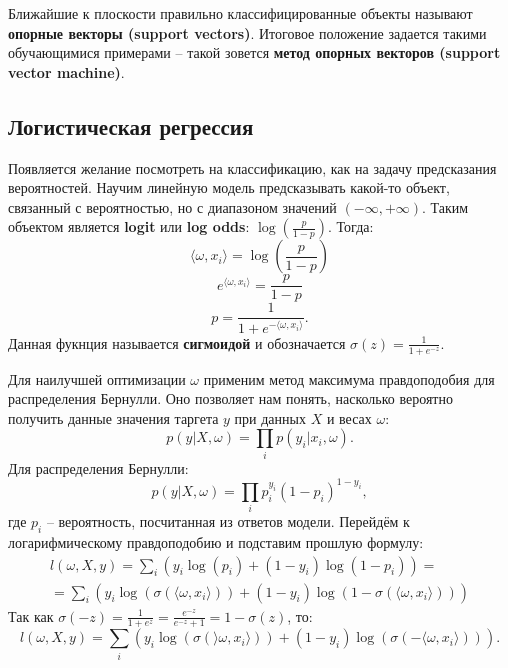 \documentclass[a4paper, 10pt, openany]{book} %
\begin{document}
	Ближайшие к плоскости правильно классифицированные объекты называют \textbf{опорные векторы (support vectors)}. Итоговое положение задается такими обучающимися примерами -- такой зовется \textbf{метод опорных векторов (support vector machine)}.
	
	\subsection{Логистическая регрессия}
	
	Появляется желание посмотреть на классификацию, как на задачу предсказания вероятностей. Научим линейную модель предсказывать какой-то объект, связанный с вероятностью, но с диапазоном значений $(-\infty, +\infty)$. Таким объектом является \textbf{logit} или \textbf{log odds}: $\log\left(\frac{p}{1-p}\right)$. Тогда:
	\begin{equation*}
		\langle\omega,x_i\rangle = \log\left(\frac{p}{1 - p}\right)
	\end{equation*}
	\begin{equation*}
		e^{\langle\omega,x_i\rangle}  = \frac{p}{1 - p}
	\end{equation*}
	\begin{equation*}
		p = \frac{1}{1 + e^{-\langle\omega,x_i\rangle}}.
	\end{equation*}
	Данная фукнция называется \textbf{сигмоидой} и обозначается $\sigma(z) = \frac{1}{1 + e^{-z}}$.
	
	Для наилучшей оптимизации $\omega$ применим метод максимума правдоподобия для распределения Бернулли. Оно позволяет нам понять, насколько вероятно получить данные значения таргета $y$ при данных $X$ и весах $\omega$:
	\begin{equation*}
		p\left(y | X,\omega\right) = \prod_i p(y_i | x_i, \omega).
	\end{equation*}
	Для распределения Бернулли:
	\begin{equation*}
		p\left(y | X,\omega\right) = \prod_i p_i^{y_i} (1 - p_i)^{1 - y_i},
	\end{equation*}
	где $p_i$ -- вероятность, посчитанная из ответов модели. Перейдём к логарифмическому правдоподобию и подставим прошлую формулу:
	\begin{multline*}
		l\left(\omega, X, y\right) = \sum_{i}(y_i \log(p_i) + (1 - y_i) \log(1 - p_i)) = \\
		= \sum_{i}(y_i \log(\sigma(\langle \omega, x_i \rangle)) + (1 - y_i) \log(1 - \sigma(\langle\omega,x_i\rangle))) 
	\end{multline*}
	Так как $\sigma(-z) = \frac{1}{1 + e^z} = \frac{e^{-z}}{e^{-z} + 1} = 1 - \sigma(z)$, то:
	\begin{equation*}
		l(\omega, X, y) = \sum_{i}(y_i \log(\sigma(\rangle\omega,x_i\rangle)) + (1 - y_i)\log(\sigma(-\langle\omega,x_i\rangle))).
	\end{equation*}
	
\end{document}
